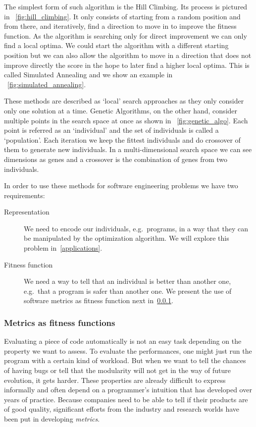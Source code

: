 \documentclass[11pt]{sdm}
\begin{document}
The simplest form of such algorithm is the Hill Climbing.
Its process is pictured in \figurename~\ref{fig:hill_climbing}.
It only consists of starting from a random position and from there, and iteratively, find a direction to move in to improve the fitness function.
As the algorithm is searching only for direct improvement we can only find a local optima.
We could start the algorithm with a different starting position but we can also allow the algorithm to move in a direction that does not improve directly the score in the hope to later find a higher local optima.
This is called Simulated Annealing and we show an example in \figurename~\ref{fig:simulated_annealing}.

These methods are described as `local' search approaches as they only consider only one solution at a time.
Genetic Algorithms, on the other hand, consider multiple points in the search space at once as shown in \figurename~\ref{fig:genetic_algo}.
Each point is referred as an `individual' and the set of individuals is called a `population'.
Each iteration we keep the fittest individuals and do crossover of them to generate new individuals.
In a multi-dimensional search space we can see dimensions as genes and a crossover is the combination of genes from two individuals.

In order to use these methods for software engineering problems we have two requirements:
\begin{description}
  \item[Representation] We need to encode our individuals, e.g.\ programs, in a way that they can be manipulated by the optimization algorithm. We will explore this problem in~\ref{applications}.
  \item[Fitness function] We need a way to tell that an individual is better than another one, e.g.\ that a program is safer than another one. We present the use of software metrics as fitness function next in~\ref{fitness_func}.
\end{description}

\subsubsection{Metrics as fitness functions}
\label{fitness_func}

Evaluating a piece of code automatically is not an easy task depending on the property we want to assess.
To evaluate the performances, one might just run the program with a certain kind of workload.
But when we want to tell the chances of having bugs or tell that the modularity will not get in the way of future evolution, it gets harder.
These properties are already difficult to express informally and often depend on a programmer's intuition that has developed over years of practice.
Because companies need to be able to tell if their products are of good quality, significant efforts from the industry and research worlds have been put in developing \textit{metrics}.
\end{document}
